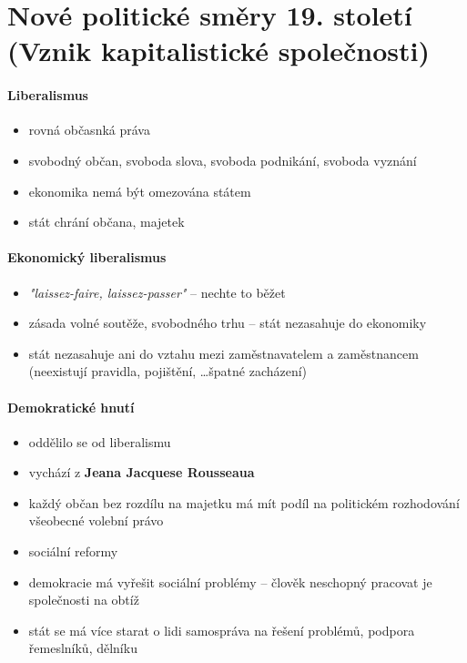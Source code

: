 \section{Nové politické směry 19. století (Vznik kapitalistické společnosti)}
\paragraph{Liberalismus}
\begin{itemize}
\item rovná občasnká práva
\item svobodný občan, svoboda slova, svoboda podnikání, svoboda vyznání
\item ekonomika nemá být omezována státem
\item stát chrání občana, majetek
\end{itemize}

\paragraph{Ekonomický liberalismus}
\begin{itemize}
\item \textit{"laissez-faire, laissez-passer"} -- nechte to běžet
\item zásada volné soutěže, svobodného trhu -- stát nezasahuje do ekonomiky
\item  stát nezasahuje ani do vztahu mezi zaměstnavatelem a zaměstnancem (neexistují pravidla, pojištění, \ldots \ra špatné zacházení)
\end{itemize}

\paragraph{Demokratické hnutí}
\begin{itemize}
\item oddělilo se od liberalismu
\item vychází z \textbf{Jeana Jacquese Rousseaua}
\item každý občan bez rozdílu na majetku má mít podíl na politickém rozhodování \ra všeobecné volební právo
\item sociální reformy
\item demokracie má vyřešit sociální problémy -- člověk neschopný pracovat je společnosti na obtíž
\item stát se má více starat o lidi \ra samospráva na řešení problémů, podpora řemeslníků, dělníku
\end{itemize}

